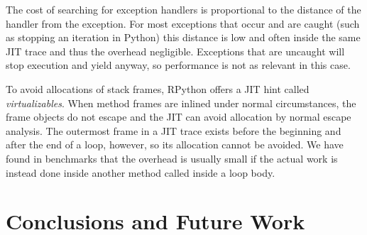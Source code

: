 \documentclass[10pt,numbers]{sigplanconf}
\begin{document}
The cost of searching for exception handlers is proportional to the distance of
the handler from the exception. For most exceptions that occur and are caught
(such as stopping an iteration in Python) this distance is low and often inside
the same JIT trace and thus the overhead negligible. Exceptions that are
uncaught will stop execution and yield anyway, so performance is not as relevant
in this case.

To avoid allocations of stack frames, RPython offers a JIT hint called
\emph{virtualizables}. When method frames are inlined under normal
circumstances, the frame objects do not escape and the JIT can avoid allocation
by normal escape analysis. The outermost frame in a JIT trace exists before the
beginning and after the end of a loop, however, so its allocation cannot be
avoided. We have found in benchmarks that the overhead is usually small if the
actual work is instead done inside another method called inside a loop body.





\section{Conclusions and Future Work}
\end{document}

